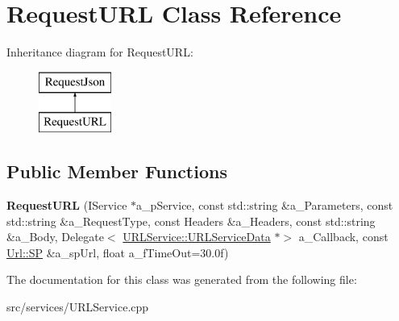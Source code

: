 \hypertarget{class_request_u_r_l}{}\section{Request\+U\+RL Class Reference}
\label{class_request_u_r_l}
Inheritance diagram for Request\+U\+RL\+:\begin{figure}[H]
\begin{center}
\leavevmode
\includegraphics[height=2.000000cm]{class_request_u_r_l}
\end{center}
\end{figure}
\subsection*{Public Member Functions}
\begin{DoxyCompactItemize}
\item 
\mbox{\label{class_request_u_r_l_abe4490cbcab7e5481a0b2858cfb46516}} 
{\bfseries Request\+U\+RL} (I\+Service $\ast$a\+\_\+p\+Service, const std\+::string \&a\+\_\+\+Parameters, const std\+::string \&a\+\_\+\+Request\+Type, const Headers \&a\+\_\+\+Headers, const std\+::string \&a\+\_\+\+Body, Delegate$<$ \hyperlink{struct_u_r_l_service_1_1_u_r_l_service_data}{U\+R\+L\+Service\+::\+U\+R\+L\+Service\+Data} $\ast$$>$ a\+\_\+\+Callback, const \hyperlink{class_url_aaca644501980743f3446d0d7a31565be}{Url\+::\+SP} \&a\+\_\+sp\+Url, float a\+\_\+f\+Time\+Out=30.\+0f)
\end{DoxyCompactItemize}


The documentation for this class was generated from the following file\+:\begin{DoxyCompactItemize}
\item 
src/services/U\+R\+L\+Service.\+cpp\end{DoxyCompactItemize}
